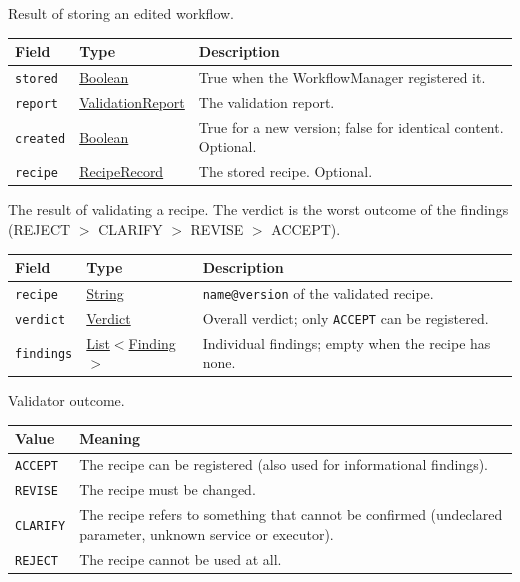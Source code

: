 \documentclass[a4paper]{arrowhead}
\newcommand{\mref}[1]{{\textcolor{ArrowheadPurple}{\hyperref[sec:model:#1]{#1}}}}
\newcommand{\pref}[1]{{\textcolor{ArrowheadGrey}{\hyperref[sec:model:primitives:#1]{#1}}}}
\begin{document}
Result of storing an edited workflow.

{\small
\begin{longtable}{|p{3.9cm}|p{4.4cm}|p{7.5cm}|}

\hline
\rowcolor{gray!33} Field & Type & Description \\ \hline
\endhead
\texttt{stored} & \pref{Boolean} & True when the WorkflowManager registered it. \\ \hline
\texttt{report} & \mref{ValidationReport} & The validation report. \\ \hline
\texttt{created} & \pref{Boolean} & True for a new version; false for identical content. Optional. \\ \hline
\texttt{recipe} & \mref{RecipeRecord} & The stored recipe. Optional. \\ \hline
\end{longtable}
}

The result of validating a recipe. The verdict is the worst outcome of the findings (REJECT $>$ CLARIFY $>$ REVISE $>$ ACCEPT).

{\small
\begin{longtable}{|p{3.9cm}|p{4.4cm}|p{7.5cm}|}

\hline
\rowcolor{gray!33} Field & Type & Description \\ \hline
\endhead
\texttt{recipe} & \pref{String} & \texttt{name@version} of the validated recipe. \\ \hline
\texttt{verdict} & \mref{Verdict} & Overall verdict; only \texttt{ACCEPT} can be registered. \\ \hline
\texttt{findings} & \pref{List}$<$\mref{Finding}$>$ & Individual findings; empty when the recipe has none. \\ \hline
\end{longtable}
}

Validator outcome.

{\small
\begin{longtable}{|p{3.9cm}|p{11.9cm}|}

\hline
\rowcolor{gray!33} Value & Meaning \\ \hline
\endhead
\texttt{ACCEPT} & The recipe can be registered (also used for informational findings). \\ \hline
\texttt{REVISE} & The recipe must be changed. \\ \hline
\texttt{CLARIFY} & The recipe refers to something that cannot be confirmed (undeclared parameter, unknown service or executor). \\ \hline
\texttt{REJECT} & The recipe cannot be used at all. \\ \hline
\end{longtable}
}
\end{document}

